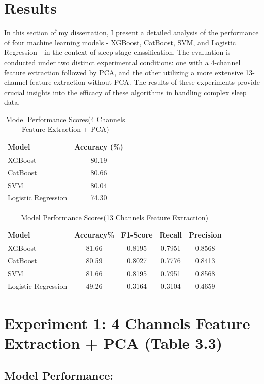 \documentclass[12pt, a4paper,oneside]{book}
\numberwithin{equation}{section}
\begin{document}
\section{Results}
In this section of my dissertation, I present a detailed analysis of the performance of four machine learning models - XGBoost, CatBoost, SVM, and Logistic Regression - in the context of sleep stage classification. The evaluation is conducted under two distinct experimental conditions: one with a 4-channel feature extraction followed by PCA, and the other utilizing a more extensive 13-channel feature extraction without PCA. The results of these experiments provide crucial insights into the efficacy of these algorithms in handling complex sleep data.
\begin{table}[ht]
\centering
\caption{Model Performance Scores(4 Channels Feature  Extraction + PCA)}
\label{tab:model-performance}
\begin{tabular}{|l|c|}
\hline
\textbf{Model} & \textbf{Accuracy (\%)} \\ \hline
XGBoost & 80.19 \\ \hline
CatBoost & 80.66 \\ \hline
SVM & 80.04 \\ \hline
Logistic Regression & 74.30 \\ \hline
\end{tabular}
\end{table}
\begin{table}[ht]
\centering
\caption{Model Performance Scores(13 Channels Feature  Extraction)}
\label{tab:performance-metrics}
\begin{tabular}{|l|c|c|c|c|}
\hline
\textbf{Model} & \textbf{Accuracy\%} & \textbf{F1-Score} & \textbf{Recall} & \textbf{Precision} \\ \hline
XGBoost & 81.66 & 0.8195 & 0.7951 & 0.8568 \\ \hline
CatBoost &80.59 & 0.8027 & 0.7776 & 0.8413 \\ \hline
SVM & 81.66 & 0.8195 & 0.7951 & 0.8568 \\ \hline
Logistic Regression & 49.26 & 0.3164 & 0.3104 & 0.4659 \\ \hline
\end{tabular}
\end{table}
\section{Experiment 1: 4 Channels Feature Extraction + PCA (Table 3.3)}
\subsection{Model Performance:}
\end{document}
